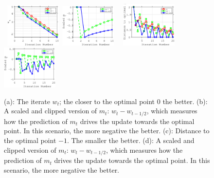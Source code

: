 \documentclass[11pt]{article}
\theoremstyle{k}
\begin{document}
\begin{figure}[H]
\centering
    \mbox{
    \includegraphics[width=0.25\textwidth]{simulation/fig/fig1_left.eps}
    \includegraphics[width=0.25\textwidth]{simulation/fig/fig1_right.eps}
    }
    \mbox{
    \includegraphics[width=0.25\textwidth]{simulation/fig/fig2_left.eps}
    \includegraphics[width=0.25\textwidth]{simulation/fig/fig2_right.eps}
    }
     \caption{\small (a): The iterate $w_t$; the closer to the optimal point $0$ the better. (b): A scaled and clipped version of $m_t$: $w_t - w_{t-1/2}$, which measures how the prediction of $m_t$ drives the update towards the optimal point. In this scenario, the more negative the better.
     (c): Distance to the optimal point $-1$. The smaller the better. (d): A scaled and clipped version of $m_t$: $w_t - w_{t-1/2}$, which measures how the prediction of $m_t$ drives
the update towards the optimal point. In this scenario, the more negative the better.
     }
     \label{simu}
\vspace{-0.2in}
\end{figure}
\end{document}
